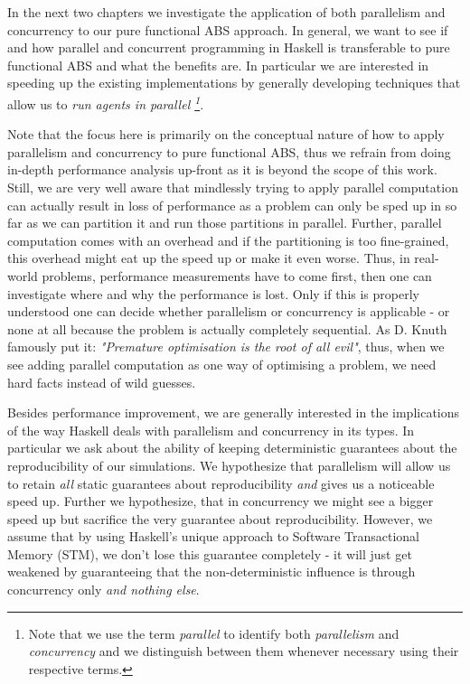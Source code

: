 In the next two chapters we investigate the application of both parallelism and concurrency to our pure functional ABS approach. In general, we want to see if and how parallel and concurrent programming in Haskell is transferable to pure functional ABS and what the benefits are. In particular we are interested in speeding up the existing implementations by generally developing techniques that allow us to  \textit{run agents in parallel \footnote{Note that we use the term \textit{parallel} to identify both \textit{parallelism} and \textit{concurrency} and we distinguish between them whenever necessary using their respective terms.}}. 

Note that the focus here is primarily on the conceptual nature of how to apply parallelism and concurrency to pure functional ABS, thus we refrain from doing in-depth performance analysis up-front as it is beyond the scope of this work. Still, we are very well aware that mindlessly trying to apply parallel computation can actually result in loss of performance as a problem can only be sped up in so far as we can partition it and run those partitions in parallel. Further, parallel computation comes with an overhead and if the partitioning is too fine-grained, this overhead might eat up the speed up or make it even worse. Thus, in real-world problems, performance measurements have to come first, then one can investigate where and why the performance is lost. Only if this is properly understood one can decide whether parallelism or concurrency is applicable - or none at all because the problem is actually completely sequential. As D. Knuth famously put it: \textit{"Premature optimisation is the root of all evil"}, thus, when we see adding parallel computation as one way of optimising a problem, we need hard facts instead of wild guesses.

Besides performance improvement, we are generally interested in the implications of the way Haskell deals with parallelism and concurrency in its types. In particular we ask about the ability of keeping deterministic guarantees about the reproducibility of our simulations. We hypothesize that parallelism will allow us to retain \textit{all} static guarantees about reproducibility \textit{and} gives us a noticeable speed up. Further we hypothesize, that in concurrency we might see a bigger speed up but sacrifice the very guarantee about reproducibility. However, we assume that by using Haskell's unique approach to Software Transactional Memory (STM), we don't lose this guarantee completely - it will just get weakened by guaranteeing that the non-deterministic influence is through concurrency only \textit{and nothing else}.



